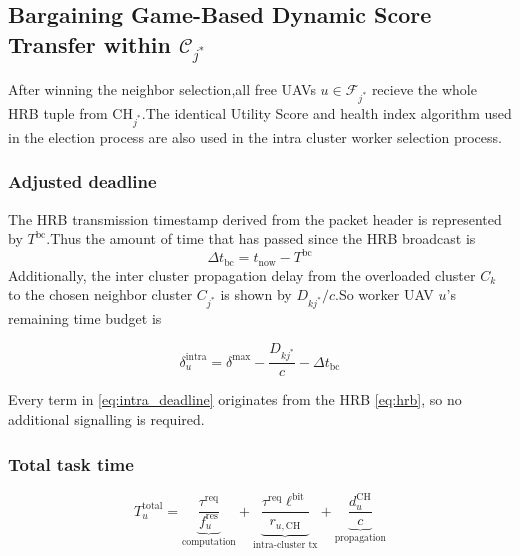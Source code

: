 \documentclass[journal]{IEEEtran}
\begin{document}
\begin{IEEEproof}
\subsection{Bargaining Game-Based Dynamic Score Transfer within \texorpdfstring{$\mathcal{C}_{j^{*}}$}{Cj*}}
\label{sec:worker}

After winning the neighbor selection,all free UAVs $u\in\mathcal{F}_{j^{*}}$ recieve the whole HRB tuple from $\mathrm{CH}_{j^{*}}$.The identical Utility Score and health index algorithm used in the election process are also used in the intra cluster worker selection process.

\subsubsection{Adjusted deadline}

The HRB transmission timestamp derived from the packet header is represented by $T^{\mathrm{bc}}$.Thus the amount of time that has passed since the HRB broadcast is
\[
\Delta t_{\mathrm{bc}} = t_{\mathrm{now}} - T^{\mathrm{bc}} 
\]
Additionally, the inter cluster propagation delay from the overloaded cluster $C_k$ to the chosen neighbor cluster  $C_{j^{*}}$ is shown by $D_{kj^{*}}/c$.So worker UAV $u$'s remaining time budget is

\begin{equation}\label{eq:intra_deadline}
  \delta_{u}^{\mathrm{intra}}
  =\delta^{\max}
  -\frac{D_{kj^{*}}}{c}
  -\Delta t_{\mathrm{bc}}
\end{equation}

Every term in \eqref{eq:intra_deadline} originates from
the HRB \eqref{eq:hrb}, so no additional signalling is
required.

\subsubsection{Total task time}

\begin{equation}\label{eq:Ttotal}
  T_{u}^{\mathrm{total}}
  =\underbrace{\frac{\tau^{\mathrm{req}}}{f_{u}^{\mathrm{res}}}}_{\text{computation}}
  +\underbrace{\frac{\tau^{\mathrm{req}}\ell^{\mathrm{bit}}}{r_{u,\mathrm{CH}}}}_{\text{intra-cluster tx}}
  +\underbrace{\frac{d_{u}^{\mathrm{CH}}}{c}}_{\text{propagation}}
\end{equation}


\end{IEEEproof}
\end{document}

